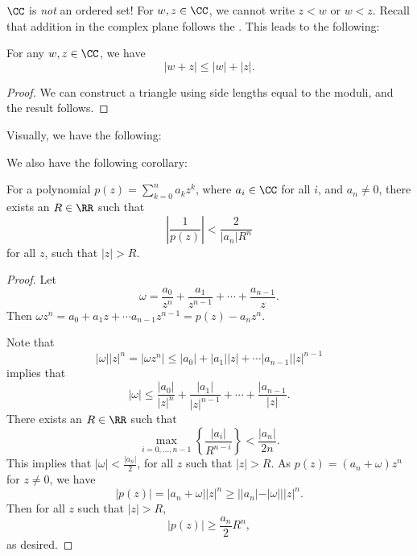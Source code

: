 $\CC$ is \emph{not} an ordered set! For $w,z \in \CC$, we cannot write $z < w$ or $w < z$. Recall that addition in the complex plane follows the . This leads to the following: 
\begin{proposition}
For any $w,z \in \CC$, we have 
\[ |w + z| \leq |w| + |z|. \] 
\end{proposition}
\begin{proof}
We can construct a triangle using side lengths equal to the moduli, and the result follows.
\end{proof}
Visually, we have the following: 

\begin{figure}[h]
\centering

\end{figure}

We also have the following corollary: 
\begin{corollary}
For a polynomial $p(z) = \sum\limits_{k=0}^n a_kz^k$, where $a_i \in \CC$ for all  $i$, and $a_n \neq 0$, there exists an $R \in \RR$ such that 
\[ \left | \frac{1}{p(z)} \right | < \frac{2}{|a_n|R^n} \] for all $z$, such that $|z| > R$. 
\end{corollary}
\begin{proof}
Let 
\[ \omega = \frac{a_0}{z^n} + \frac{a_1}{z^{n-1}} + \cdots + \frac{a_{n-1}}{z}. \] 
Then $\omega z^n = a_0 + a_1z + \cdots a_{n-1}z^{n-1} = p(z) - a_nz^n$.

Note that 
\[ |\omega||z|^n = |\omega z^n| \leq |a_0| + |a_1||z| + \cdots |a_{n-1}||z|^{n-1} \] implies that 
\[ |\omega| \leq \frac{|a_0|}{|z|^n} + \frac{|a_1|}{|z|^{n-1}} + \cdots + \frac{|a_{n-1}}{|z|}. \] There exists an $R \in \RR$ such that 
\[ \max\limits_{i=0,\ldots,n-1} \left \{ \frac{|a_i|}{R^{n-i}} \right \} < \frac{|a_n|}{2n}. \] This implies that $|\omega| < \frac{|a_n|}{2}$, for all $z$ such that $|z| > R$. As $p(z) = (a_n + \omega)z^n$ for $z \neq 0$, we have 
\[ |p(z)| = |a_n + \omega||z|^n \geq ||a_n| - |\omega|||z|^n. \] Then for all $z$ such that $|z| > R$, 
\[ |p(z)| \geq \frac{a_n}{2}R^n, \] as desired. 
\end{proof}
